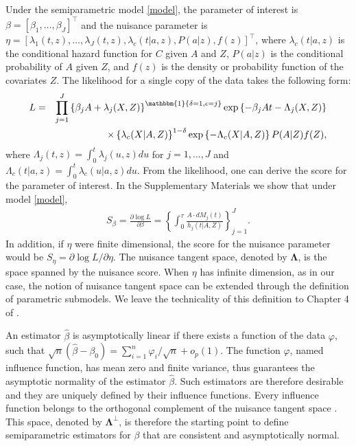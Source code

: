 \documentclass[11pt]{article}
\newcommand{\ee}{\end{eqnarray}}
\newcommand{\eqnn}{\begin{eqnarray*}}
\newcommand{\een}{\end{eqnarray*}}
\newcommand{\be}{\begin{eqnarray}}
\begin{document}
Under the semiparametric  model \eqref{model}, %
the parameter of interest is $\beta=[\beta_1,\ldots,\beta_J]^\top$ and the nuisance parameter is $\eta=[\lambda_1(t, z), \ldots, \lambda_J(t, z), \lambda_{c}(t | a,z), P(a|z), f(z)]^\top$, where $\lambda_c(t | a,z)$ is the conditional hazard function for $C$ given $A$ and $Z$, $P(a| z)$ is the conditional probability of $A$ given $Z$, and $f(z)$ is the density or probability function of the covariates $Z$.
The likelihood for a single copy of the data takes  the following form:
\eqnn
L&=&\prod_{j=1}^J\left\{\beta_j A + \lambda_j(X,Z)\right\}^{\mathbbm{1}\{\delta=1, \epsilon=j\}}\exp\left\{-\beta_j At-\Lambda_j(X,Z)\right\} \\
&& \times \left\{\lambda_c(X | A,Z)\right\}^{1-\delta}\exp\left\{-\Lambda_c(X | A,Z)\right\}
P(A|Z) f(Z),
\een
where $\Lambda_j(t,z)=\int_0^t\lambda_j(u,z)du$ for $j=1,\ldots,J$ and $\Lambda_c(t| a,z)=\int_0^t\lambda_c(u| a,z)du$.
From the likelihood, one can derive the score for the parameter of interest.
In the Supplementary Materials we show that under model \eqref{model}, 
\be\label{eq:Sbeta}
S_\beta = \frac{\partial \log L }{ \partial\beta} =\left\{ \int_0^\tau \frac{A \cdot {dM_j(t)} }{ h_j(t | A,Z)} \right\}_{j=1}^J.
\ee
In addition, if $\eta$ were finite dimensional, the score for the nuisance parameter would be $S_\eta=\partial \log L /\partial \eta$. The nuisance tangent space, denoted by $\mathbf\Lambda$,  is the space spanned by the nuisance score. When $\eta$ has infinite dimension, as in our case, the notion of nuisance tangent space can be extended through the definition of parametric submodels. We leave the technicality of this definition to Chapter 4 of \cite{tsiatis2007semiparametric}. 

An estimator $\hat \beta$ is asymptotically linear if there exists a function of the data $\varphi$, such that $\sqrt{n}(\hat \beta-\beta_0)= \sum_{i=1}^n\varphi_i / \sqrt{n} +o_p(1)$. The function $\varphi$, named influence function, has mean zero and finite variance, thus guarantees the asymptotic normality of the estimator $\hat \beta$. Such estimators are therefore desirable and they are uniquely defined by their influence functions. 
Every influence function belongs to the orthogonal complement of the nuisance tangent space \citep[Theorem 4.2]{tsiatis2007semiparametric}. 
This space, denoted by $\mathbf\Lambda^\perp$, is therefore the starting point to define semiparametric estimators for $\beta$ that are consistent and asymptotically normal.
\end{document}
